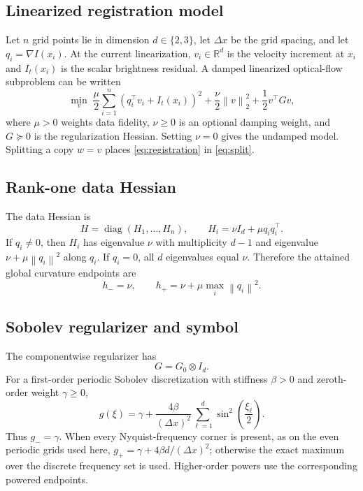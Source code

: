 \documentclass[pdflatex,iicol,sn-mathphys-num]{sn-jnl}
\theoremstyle{definition}
\newcommand{\R}{\mathbb{R}}
\newcommand{\norm}[1]{\left\lVert #1\right\rVert}
\newcommand{\diag}{\operatorname{diag}}
\begin{document}
\subsection{Linearized registration model}
Let $n$ grid points lie in dimension $d\in\{2,3\}$, let $\Delta x$ be the grid
spacing, and let $q_i=\nabla I(x_i)$. At the current linearization,
$v_i\in\R^d$ is the velocity increment at $x_i$ and $I_t(x_i)$ is the scalar
brightness residual. A damped linearized optical-flow subproblem can be written
\begin{equation}
\min_v\;
\frac{\mu}{2}\sum_{i=1}^n(q_i^\top v_i+I_t(x_i))^2
+\frac{\nu}{2}\norm{v}_2^2+\frac12v^\top Gv,
\label{eq:registration}
\end{equation}
where $\mu>0$ weights data fidelity, $\nu\ge0$ is an optional damping weight,
and $G\succeq0$ is the regularization Hessian. Setting $\nu=0$ gives the
undamped model.
Splitting a copy $w=v$ places \eqref{eq:registration} in
\eqref{eq:split}.

\subsection{Rank-one data Hessian}
The data Hessian is
\begin{equation}
H=\diag(H_1,\ldots,H_n),\qquad
H_i=\nu I_d+\mu q_iq_i^\top.
\label{eq:registration_H}
\end{equation}
If $q_i\ne0$, then $H_i$ has eigenvalue $\nu$ with multiplicity $d-1$ and
eigenvalue $\nu+\mu\norm{q_i}^2$ along $q_i$. If $q_i=0$, all $d$ eigenvalues
equal $\nu$. Therefore the attained global curvature endpoints are
\begin{equation}
h_-=\nu,\qquad h_+=\nu+\mu\max_i\norm{q_i}^2.
\label{eq:h_endpoints}
\end{equation}

\subsection{Sobolev regularizer and symbol}
The componentwise regularizer has
\[
G=G_0\otimes I_d.
\]
For a first-order periodic Sobolev discretization with stiffness $\beta>0$ and
zeroth-order weight $\gamma\ge0$,
\begin{equation}
g(\xi)=\gamma+
\frac{4\beta}{(\Delta x)^2}
\sum_{\ell=1}^d\sin^2\left(\frac{\xi_\ell}{2}\right).
\label{eq:sobolev_symbol}
\end{equation}
Thus $g_-=\gamma$. When every Nyquist-frequency corner is present, as on the
even periodic grids used here,
$g_+=\gamma+4\beta d/(\Delta x)^2$; otherwise the exact maximum over the
discrete frequency set is used. Higher-order powers use the corresponding
powered endpoints.
\end{document}
